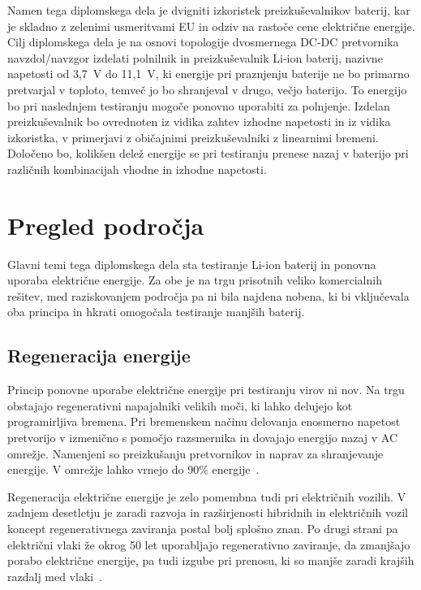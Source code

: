 \documentclass[a4paper,twoside,openright,12pt,slovene]{book}
\begin{document}
Namen tega diplomskega dela je dvigniti izkoristek preizkuševalnikov baterij, kar je skladno z zelenimi usmeritvami EU in odziv na rastoče cene električne energije.
Cilj diplomskega dela je na osnovi topologije dvosmernega DC-DC pretvornika navzdol/navzgor izdelati polnilnik in preizkuševalnik Li-ion baterij,
nazivne napetosti od 3,7~V do 11,1~V, ki energije pri praznjenju baterije ne bo primarno pretvarjal v toploto, temveč jo bo shranjeval v drugo, večjo baterijo.
To energijo bo pri naslednjem testiranju mogoče ponovno uporabiti za polnjenje.
Izdelan preizkuševalnik bo ovrednoten iz vidika zahtev izhodne napetosti in iz vidika izkoristka, v primerjavi z običajnimi preizkuševalniki z linearnimi bremeni.
Določeno bo, kolikšen delež energije se pri testiranju prenese nazaj v baterijo pri različnih kombinacijah vhodne in izhodne napetosti.




\chapter{Pregled področja} \label{ch:pregled_podrocja}

Glavni temi tega diplomskega dela sta testiranje Li-ion baterij in ponovna uporaba električne energije.
Za obe je na trgu prisotnih veliko komercialnih rešitev, med raziskovanjem področja pa ni bila najdena nobena,
ki bi vključevala oba principa in hkrati omogočala testiranje manjših baterij.

\section{Regeneracija energije} \label{sec:regeneracija_energije}
Princip ponovne uporabe električne energije pri testiranju virov ni nov.
Na trgu obstajajo regenerativni napajalniki velikih moči, ki lahko delujejo kot programirljiva bremena.
Pri bremenskem načinu delovanja enosmerno napetost pretvorijo v izmenično s pomočjo razsmernika in dovajajo energijo nazaj v AC omrežje.
Namenjeni so preizkušanju pretvornikov in naprav za shranjevanje energije.
V omrežje lahko vrnejo do 90\% energije~\cite{keysight_technologies_rp7900_nodate}.

Regeneracija električne energije je zelo pomembna tudi pri električnih vozilih.
V zadnjem desetletju je zaradi razvoja in razširjenosti hibridnih in električnih vozil koncept regenerativnega zaviranja postal bolj splošno znan.
Po drugi strani pa električni vlaki že okrog 50 let uporabljajo regenerativno zaviranje, da zmanjšajo porabo električne energije,
pa tudi izgube pri prenosu, ki so manjše zaradi krajših razdalj med vlaki~\cite{ogasa_energy_2008}.
\newpage
\end{document}
